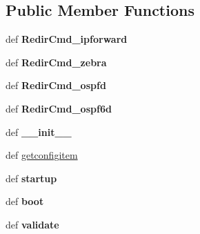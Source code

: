 \subsection*{Public Member Functions}
\begin{DoxyCompactItemize}
\item 
\hypertarget{classcore_1_1xen_1_1xen_1_1_xen_node_aaebbb786872abe0497c2bbbc5567bbae}{def {\bfseries Redir\+Cmd\+\_\+ipforward}}\label{classcore_1_1xen_1_1xen_1_1_xen_node_aaebbb786872abe0497c2bbbc5567bbae}

\item 
\hypertarget{classcore_1_1xen_1_1xen_1_1_xen_node_afc7c9ece0fff262d0f474a2bd1dc7bd3}{def {\bfseries Redir\+Cmd\+\_\+zebra}}\label{classcore_1_1xen_1_1xen_1_1_xen_node_afc7c9ece0fff262d0f474a2bd1dc7bd3}

\item 
\hypertarget{classcore_1_1xen_1_1xen_1_1_xen_node_a737192ee686091d3d67dc651bd4ed733}{def {\bfseries Redir\+Cmd\+\_\+ospfd}}\label{classcore_1_1xen_1_1xen_1_1_xen_node_a737192ee686091d3d67dc651bd4ed733}

\item 
\hypertarget{classcore_1_1xen_1_1xen_1_1_xen_node_a0b27aa8d17c5b7a6e44d8574b84cc219}{def {\bfseries Redir\+Cmd\+\_\+ospf6d}}\label{classcore_1_1xen_1_1xen_1_1_xen_node_a0b27aa8d17c5b7a6e44d8574b84cc219}

\item 
\hypertarget{classcore_1_1xen_1_1xen_1_1_xen_node_a678c717b5794430407b635f81ecf8584}{def {\bfseries \+\_\+\+\_\+init\+\_\+\+\_\+}}\label{classcore_1_1xen_1_1xen_1_1_xen_node_a678c717b5794430407b635f81ecf8584}

\item 
def \hyperlink{classcore_1_1xen_1_1xen_1_1_xen_node_a72f384aa97736d91ce6fa72d5bfe1a42}{getconfigitem}
\item 
\hypertarget{classcore_1_1xen_1_1xen_1_1_xen_node_a125fcba03ea4ddbb0d41cec7842dc948}{def {\bfseries startup}}\label{classcore_1_1xen_1_1xen_1_1_xen_node_a125fcba03ea4ddbb0d41cec7842dc948}

\item 
\hypertarget{classcore_1_1xen_1_1xen_1_1_xen_node_a992749456b7d72619dfd752544a2f80c}{def {\bfseries boot}}\label{classcore_1_1xen_1_1xen_1_1_xen_node_a992749456b7d72619dfd752544a2f80c}

\item 
\hypertarget{classcore_1_1xen_1_1xen_1_1_xen_node_a6069f9a86a68e0aa0b389d58c6f1138c}{def {\bfseries validate}}\label{classcore_1_1xen_1_1xen_1_1_xen_node_a6069f9a86a68e0aa0b389d58c6f1138c}


\end{DoxyCompactItemize}
